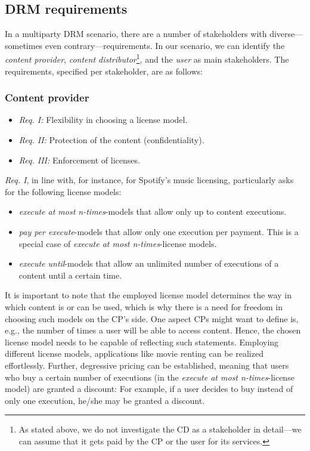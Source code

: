 \documentclass{llncs}
\begin{document}
\subsection{DRM requirements} \label{requirements}

In a multiparty DRM scenario, there are a number of stakeholders with diverse---sometimes even contrary---requirements. In our scenario, we can identify the \emph{content provider}, \emph{content distributor}\footnote{As stated above, we do not investigate the CD as a stakeholder in detail---we can assume that it gets paid by the CP or the user for its services.}, and the \emph{user} as main stakeholders. The requirements, specified per stakeholder, are as follows:

\subsubsection{Content provider}

\begin{itemize}
\item \emph{Req. I:} Flexibility in choosing a license model.
\item \emph{Req. II:} Protection of the content (confidentiality). 
\item \emph{Req. III:} Enforcement of licenses.
\end{itemize}

\emph{Req. I}, in line with, for instance, \cite{music-licensing} for Spotify's music licensing, particularly asks for the following license models: 
\begin{itemize}
\item \emph{execute at most n-times}-models that allow only up to  content executions.
\item \emph{pay per execute}-models that allow only one execution per payment. This is a special case of \emph{execute at most n-times}-license models.
\item \emph{execute until}-models that allow an unlimited number of executions of a content until a certain time.
\end{itemize}

It is important to note that the employed license model determines the way in which content is or can be used, which is why there is a need for freedom in choosing such models on the CP's side. One aspect CPs might want to define is, e.g., the number of times a user will be able to access content. Hence, the chosen license model needs to be capable of reflecting such statements. Employing different license models, applications like movie renting can be realized effortlessly. Further, degressive pricing can be established, meaning that users who buy a certain number of executions (in the \emph{execute at most n-times}-license model) are granted a discount: For example, if a user decides to buy  instead of only one execution, he/she may be granted a  discount.
\end{document}
